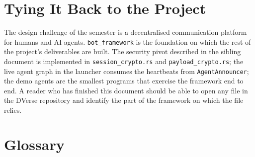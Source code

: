 \documentclass[11pt,a4paper]{article}
\begin{document}
\section{Tying It Back to the Project}

The design challenge of the semester is a decentralised
communication platform for humans and AI agents.
\texttt{bot\_framework} is the foundation on which the rest of
the project's deliverables are built. The security pivot
described in the sibling document is implemented in
\texttt{session\_crypto.rs} and \texttt{payload\_crypto.rs}; the
live agent graph in the launcher consumes the heartbeats from
\texttt{AgentAnnouncer}; the demo agents are the smallest
programs that exercise the framework end to end. A reader who
has finished this document should be able to open any file in
the DVerse repository and identify the part of the framework on
which the file relies.

\section*{Glossary}
\end{document}
